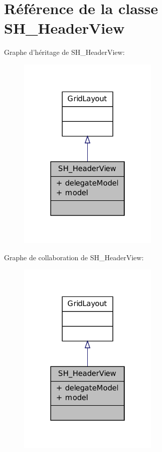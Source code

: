 \hypertarget{classSH__HeaderView}{\section{Référence de la classe S\-H\-\_\-\-Header\-View}
\label{classSH__HeaderView}
}


Graphe d'héritage de S\-H\-\_\-\-Header\-View\-:\nopagebreak
\begin{figure}[H]
\begin{center}
\leavevmode
\includegraphics[width=190pt]{classSH__HeaderView__inherit__graph}
\end{center}
\end{figure}


Graphe de collaboration de S\-H\-\_\-\-Header\-View\-:\nopagebreak
\begin{figure}[H]
\begin{center}
\leavevmode
\includegraphics[width=190pt]{classSH__HeaderView__coll__graph}
\end{center}
\end{figure}
